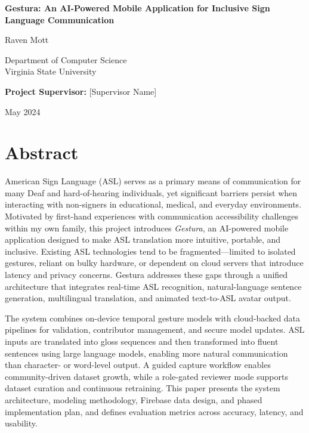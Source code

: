 \documentclass[12pt,a4paper]{article}
\begin{document}
\begin{titlepage}
    \centering
    \vspace*{2cm}
    {\huge \bfseries Gestura: An AI-Powered Mobile Application for Inclusive Sign Language Communication \par}
    \vspace{2cm}
    {\Large Raven Mott \par}
    \vspace{1cm}
    {\large Department of Computer Science \\ Virginia State University \par}
    \vspace{2cm}
    {\large \textbf{Project Supervisor:} [Supervisor Name] \par}
    \vspace{2cm}
    {\large May 2024 \par}
    \vfill
\end{titlepage}

\section*{Abstract}
American Sign Language (ASL) serves as a primary means of communication for many Deaf and hard-of-hearing individuals, yet significant barriers persist when interacting with non-signers in educational, medical, and everyday environments. Motivated by first-hand experiences with communication accessibility challenges within my own family, this project introduces \emph{Gestura}, an AI-powered mobile application designed to make ASL translation more intuitive, portable, and inclusive. Existing ASL technologies tend to be fragmented—limited to isolated gestures, reliant on bulky hardware, or dependent on cloud servers that introduce latency and privacy concerns. Gestura addresses these gaps through a unified architecture that integrates real-time ASL recognition, natural-language sentence generation, multilingual translation, and animated text-to-ASL avatar output.

The system combines on-device temporal gesture models with cloud-backed data pipelines for validation, contributor management, and secure model updates. ASL inputs are translated into gloss sequences and then transformed into fluent sentences using large language models, enabling more natural communication than character- or word-level output. A guided capture workflow enables community-driven dataset growth, while a role-gated reviewer mode supports dataset curation and continuous retraining. This paper presents the system architecture, modeling methodology, Firebase data design, and phased implementation plan, and defines evaluation metrics across accuracy, latency, and usability.
\end{document}
